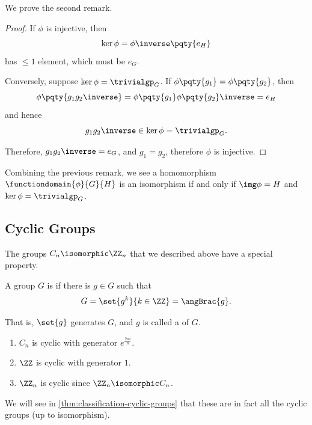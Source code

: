 We prove the second remark.

\begin{proof}
    If \(\phi\) is injective, then
    \[
        \ker \phi = \phi\inverse\pqty{e_H}
    \]
    has \(\leq 1\) element, which must be \(e_G\).

    Conversely, suppose \(\ker \phi = \trivialgp_G\). If \(\phi\pqty{g_1} = \phi\pqty{g_2}\), then
    \[
        \phi\pqty{g_1 g_2\inverse} = \phi\pqty{g_1} \phi\pqty{g_2}\inverse = e_H
    \]
    and hence
    \[
        g_1 g_2\inverse \in \ker \phi = \trivialgp_G.
    \]

    Therefore, \(g_1 g_2\inverse = e_G\), and \(g_1 = g_2\), therefore \(\phi\) is injective.
\end{proof}

\begin{remark}
    Combining the previous remark, we see a homomorphism \(\functiondomain{\phi}{G}{H}\) is an isomorphism if and only if \(\img \phi = H\) and \(\ker \phi = \trivialgp_G\).
\end{remark}

\subsection{Cyclic Groups}
\label{sec:cyclic-groups}

The groups \(C_n \isomorphic \ZZ_n\) that we described above have a special property.

\begin{definition}
    \label{def:cyclic-group}%
    A group \(G\) is  if there is \(g \in G\) such that
    \[
        G = \set{g^k}{k \in \ZZ} = \angBrac{g}.
    \]

    That is, \(\set{g}\) generates \(G\), and \(g\) is called a  of \(G\).
\end{definition}

\begin{examples*}
    \begin{enumerate}
        \item \(C_n\) is cyclic with generator \(e^{\frac{2 \pi i}{n}}\).
        \item \(\ZZ\) is cyclic with generator \(1\).
        \item \(\ZZ_n\) is cyclic since \(\ZZ_n \isomorphic C_n\).
    \end{enumerate}
\end{examples*}

We will see in \autoref{thm:classification-cyclic-groups} that these are in fact all the cyclic groups (up to isomorphism).

